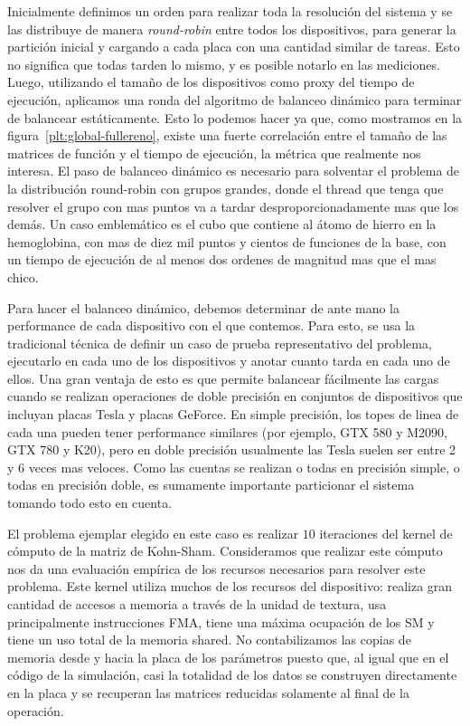 Inicialmente definimos un orden para realizar toda la resoluci\'on del sistema y
se las distribuye de manera \textit{round-robin} entre todos los dispositivos, para generar la
partici\'on inicial y cargando a cada placa con una cantidad similar de tareas. Esto no significa
que todas tarden lo mismo, y es posible notarlo en las mediciones. Luego, utilizando el tama\~no
de los dispositivos como proxy del tiempo de ejecuci\'on, aplicamos una ronda del algoritmo de balanceo din\'amico
para terminar de balancear est\'aticamente. Esto lo podemos hacer ya que, como mostramos en la figura~\ref{plt:global-fullereno},
existe una fuerte correlaci\'on entre el tama\~no de las matrices de funci\'on y el tiempo de ejecuci\'on, la m\'etrica que realmente
nos interesa. El paso de balanceo din\'amico es necesario para solventar el problema de la distribuci\'on
round-robin con grupos grandes, donde el thread que tenga que resolver el grupo con mas puntos va a tardar
desproporcionadamente mas que los dem\'as. Un caso emblem\'atico es el cubo que contiene al \'atomo de hierro en la hemoglobina,
con mas de diez mil puntos y cientos de funciones de la base, con un tiempo de ejecuci\'on de al menos
dos ordenes de magnitud mas que el mas chico.

Para hacer el balanceo din\'amico, debemos determinar de ante mano la performance de cada
dispositivo con el que contemos. Para esto, se usa la tradicional t\'ecnica de definir un
caso de prueba representativo del problema, ejecutarlo en cada uno de los dispositivos y anotar
cuanto tarda en cada uno de ellos. Una gran ventaja de esto es que permite balancear f\'acilmente las
cargas cuando se realizan operaciones de doble precisi\'on en conjuntos de dispositivos que incluyan
placas Tesla y placas GeForce. En simple precisi\'on, los topes de linea de cada una pueden tener
performance similares (por ejemplo, GTX 580 y M2090, GTX 780 y K20), pero en doble precisi\'on
usualmente las Tesla suelen ser entre 2 y 6 veces mas veloces. Como las cuentas se realizan
o todas en precisi\'on simple, o todas en precisi\'on doble, es sumamente importante particionar el
sistema tomando todo esto en cuenta.

El problema ejemplar elegido en este caso es realizar $10$ iteraciones del kernel de c\'omputo de la matriz de Kohn-Sham.
Consideramos que realizar este c\'omputo nos da una evaluaci\'on
emp\'irica de los recursos necesarios para resolver este problema. Este kernel utiliza muchos
de los recursos del dispositivo: realiza gran cantidad de accesos a memoria a trav\'es
de la unidad de textura, usa principalmente instrucciones FMA, tiene una m\'axima ocupaci\'on de los SM
y tiene un uso total de la memoria shared. No contabilizamos las copias de memoria desde y hacia la
placa de los par\'ametros puesto que, al igual que en el c\'odigo de la simulaci\'on, casi la totalidad
de los datos se construyen directamente en la placa y se recuperan las matrices reducidas solamente al final
de la operaci\'on.

